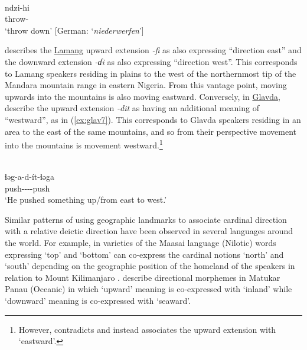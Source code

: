 \ea\label{ex:bura17}
 \\
\gll ndzi-hi \\
throw- \\
\glt `throw down' [German: `\textit{niederwerfen}'] 
\z 

\citet[141]{wolffLamangLanguageDictionary2015} describes the \hyperref[lama]{Lamang} upward extension \textit{-fi} as also expressing ``direction east'' and the downward extension \textit{-ɗi} as also expressing ``direction west''. This corresponds to Lamang speakers residing in plains to the west of the northernmost tip of the Mandara mountain range in eastern Nigeria. From this vantage point, moving upwards into the mountains is also moving eastward. Conversely, in \hyperref[glav]{Glavda}, \citet[662]{bubaGlavdaMorphology2007} describe the upward extension \textit{-dit} as having an additional meaning of ``westward'', as in (\ref{ex:glav7}). This corresponds to Glavda speakers residing in an area to the east of the same mountains, and so from their perspective movement into the mountains is movement westward.\footnote{However, \citet{nghagyiyaSketchGlavdaGrammar2011} contradicts \citet[662]{bubaGlavdaMorphology2007} and instead associates the upward extension with `eastward'.} 

\ea\label{ex:glav7}
 \\
\gll ɬəg-a-d-ít-ɬəga \\
push----push \\
\glt `He pushed something up/from east to west.'
\z

Similar patterns of using geographic landmarks to associate cardinal direction with a relative deictic direction have been observed in several languages around the world. For example, in varieties of the Maasai language (Nilotic) words expressing `top' and `bottom' can co-express the cardinal notions `north' and `south' depending on the geographic position of the homeland of the speakers in relation to Mount Kilimanjaro \citep{mietznerSpatialOrientationNilotic2012}. \citet{barthDirectionalConstructionsMatukar2015} describe directional morphemes in Matukar Panau (Oceanic) in which `upward' meaning is co-expressed with `inland' while `downward' meaning is co-expressed with `seaward'. 

